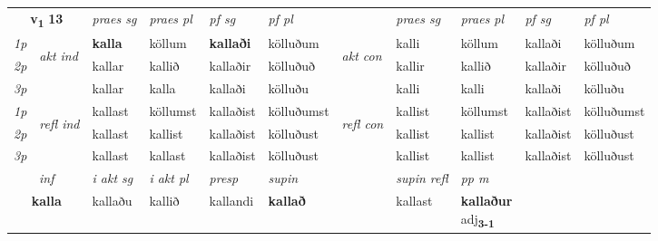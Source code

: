\noindent
\begin{tabular}{lllllllllll} \toprule
\multicolumn{2}{c}{\textbf{v{\textsubscript{1}}} \Large{\textbf{13}}}  &  \textit{praes sg}  & \textit{praes pl}  &\textit{ pf sg} & \textit{pf pl} &  &  \textit{praes sg}  & \textit{praes pl}  & \textit{pf sg} & \textit{pf pl } \\*
	\cmidrule{3-6} \cmidrule{8-11}
 {\textit{1p}} & \multirow{3}{*}{\begin{turn}{90}\textit{akt ind}\end{turn}} & \textbf{kalla} & köllum & \textbf{kallaði} & kölluðum & \multirow{3}{*}{\begin{turn}{90}\textit{akt con}\end{turn}} &kalli & köllum & kallaði & kölluðum\\*
 {\textit{2p}} &  &  kallar  & kallið & kallaðir & kölluðuð & & kallir & kallið & kallaðir & kölluðuð \\*
{\textit{3p}} &  & kallar & kalla & kallaði & kölluðu & & kalli & kalli& kallaði & kölluðu \\*
\cmidrule{3-6} \cmidrule{8-11}
 {\textit{1p}} & \multirow{3}{*}{\begin{turn}{90}\textit{refl ind}\end{turn}}  & kallast & köllumst & kallaðist & kölluðumst & \multirow{3}{*}{\begin{turn}{90}\textit{refl con}\end{turn}}  &kallist & köllumst & kallaðist & kölluðumst \\*
 {\textit{2p}} &  & kallast & kallist & kallaðist & kölluðust & &kallist & kallist & kallaðist & kölluðust \\*
 {\textit{3p}}  & & kallast & kallast & kallaðist & kölluðust & & kallist & kallist& kallaðist & kölluðust \\*
\cmidrule{3-6} \cmidrule{8-11}

   \multicolumn{2}{c}{\textit{inf}}  & \textit{i akt sg} & \textit{i akt pl}   & \textit{presp} & \textit{supin} && \textit{supin refl} & \textit{pp m} \\*
  \multicolumn{2}{c}{\textbf{kalla}} & kallaðu  & kallið   & kallandi &  \textbf{kallað} && kallast & \specialcell{\textbf{kallaður} \\ adj\textbf{\textsubscript{3-1}}} \\*
\end{tabular}

